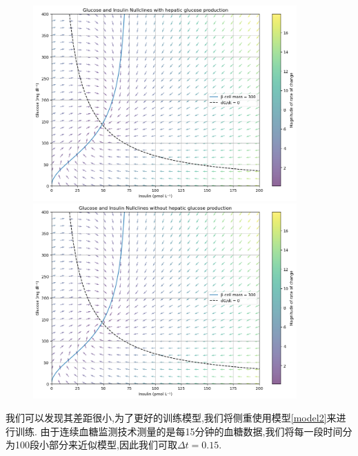 \begin{figure}[H]
    \begin{minipage}[t]{0.5\textwidth}
        \centering
        \includegraphics[width=0.9\textwidth]{Img/phase_300.png}
    \end{minipage}
    \begin{minipage}[t]{0.5\textwidth}
        \centering
        \includegraphics[width=0.9\textwidth]{Img/phase_hepatic.png}
    \end{minipage}
\end{figure}
我们可以发现其差距很小,为了更好的训练模型,我们将侧重使用模型\ref{model2}来进行训练. 
由于连续血糖监测技术测量的是每15分钟的血糖数据,我们将每一段时间分为100段小部分来近似模型,因此我们可取$\Delta t = 0.15$. 

